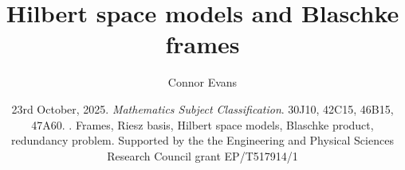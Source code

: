 \documentclass[10pt, reqno]{amsart}
\theoremstyle{definition}
\numberwithin{equation}{section}
\begin{document}
\setcounter{page}{1}


\centerline{}

\centerline{}



\title[Hilbert space models and Blaschke frames]{Hilbert space models and Blaschke frames}

\author[Connor Evans]{Connor Evans}

\address{School of Mathematics, Statistics and Physics, Newcastle University, Newcastle upon
Tyne NE1 7RU, U.K.}
\email{\textcolor[rgb]{0.00,0.00,0.00}{CEvansMathematics@outlook.com}}





\date{23rd October, 2025.
\newline {} {\it{Mathematics Subject Classification}}. 30J10, 42C15, 46B15, 47A60.
\newline {}. Frames, Riesz basis, Hilbert space models, Blaschke product, redundancy problem. 
\newline \indent Supported by the the Engineering and Physical Sciences Research Council grant EP/T517914/1}




 
\end{document}
